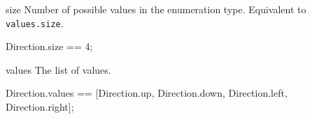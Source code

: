 \begin{urbiscriptapi}
\item[size]
  Number of possible values in the enumeration type. Equivalent to
  \lstinline{values.size}.
\begin{urbiassert}
Direction.size == 4;
\end{urbiassert}


\item[values]
  The list of values.
\begin{urbiassert}
Direction.values
  == [Direction.up, Direction.down, Direction.left, Direction.right];
\end{urbiassert}
\end{urbiscriptapi}

